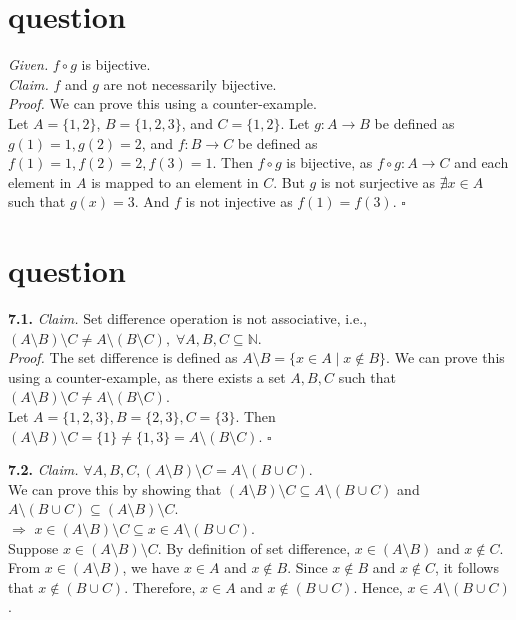 \documentclass[11pt]{article}
\begin{document}
\section{question}
\emph{Given. } $f \circ g$ is bijective. \medskip \\
\emph{Claim. } $f$ and $g$ are not necessarily bijective. \medskip \\
\emph{Proof. } We can prove this using a counter-example. \\
Let $A = \{1, 2\}$, $B = \{1, 2, 3\}$, and $C = \{1, 2\}$. Let $g: A \to B$ be defined as $g(1) = 1, g(2) = 2$, and $f: B \to C$ be defined as $f(1) = 1, f(2) = 2, f(3) = 1$. Then $f \circ g$ is bijective, as $f \circ g: A \to C$ and each element in $A$ is mapped to an element in $C$. But $g$ is not surjective as $\nexists x \in A$ such that $g(x) = 3$. And $f$ is not injective as $f(1) = f(3)$. \hfill $\square$





\section{question}
\textbf{7.1. } \emph{Claim. } Set difference operation is not associative, i.e., $(A \setminus B) \setminus C \neq A \setminus (B \setminus C), \; \forall A, B, C \subseteq \mathbb{N}$. \\
\emph{Proof. }The set difference is defined as $A \setminus B = \{x \in A \mid x \notin B\}$.
We can prove this using a counter-example, as there exists a set $A, B, C$ such that $(A \setminus B) \setminus C \neq A \setminus (B \setminus C)$. \\
Let $A = \{1, 2, 3\}, B = \{2, 3\}, C = \{3\}$. Then $(A \setminus B) \setminus C = \{1\} \neq \{1, 3\} = A \setminus (B \setminus C)$. \hfill $\square$
\vspace{15pt}

\noindent \textbf{7.2. } \emph{Claim. } $\forall A, B, C, (A \setminus B) \setminus C = A \setminus (B \cup C)$. \medskip \\
We can prove this by showing that $(A \setminus B) \setminus C \subseteq A \setminus (B \cup C)$ and $A \setminus (B \cup C) \subseteq (A \setminus B) \setminus C$. \smallskip \\
\noindent $\Rightarrow$ $x \in (A \setminus B) \setminus C \subseteq x \in A \setminus (B \cup C)$. \\
    Suppose $x \in (A \setminus B) \setminus C$.
    By definition of set difference, $x \in (A \setminus B)$ and $x \notin C$.
    From $x \in (A \setminus B)$, we have $x \in A$ and $x \notin B$.
    Since $x \notin B$ and $x \notin C$, it follows that $x \notin (B \cup C)$.
    Therefore, $x \in A$ and $x \notin (B \cup C)$.
    Hence, $x \in A \setminus (B \cup C)$.
\medskip
\end{document}
